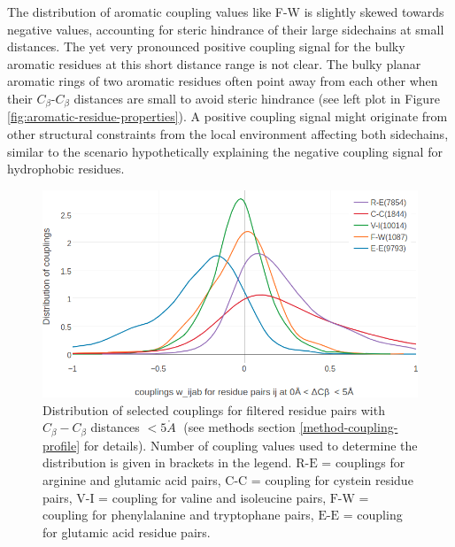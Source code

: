 \documentclass[11pt,a4paper,twoside]{book}
\newcommand{\Cb}{C_\beta}
\newcommand{\angstrom}{\mathring{A} \;}
\theoremstyle{definition}
\theoremstyle{definition}
\theoremstyle{remark}
\begin{document}
The distribution of aromatic coupling values like F-W is slightly skewed
towards negative values, accounting for steric hindrance of their large
sidechains at small distances. The yet very pronounced positive coupling
signal for the bulky aromatic residues at this short distance range is
not clear. The bulky planar aromatic rings of two aromatic residues
often point away from each other when their \(\Cb\)-\(\Cb\) distances
are small to avoid steric hindrance (see left plot in Figure
\ref{fig:aromatic-residue-properties}). A positive coupling signal might
originate from other structural constraints from the local environment
affecting both sidechains, similar to the scenario hypothetically
explaining the negative coupling signal for hydrophobic residues.











\begin{figure}

{\centering \includegraphics[width=1\linewidth]{img/coupling_matrix_analysis/1d_coupling_profile_0_5} 

}

\caption{Distribution of selected couplings
for filtered residue pairs with \(\Cb-\Cb\) distances \(< 5\angstrom\)
(see methods section \ref{method-coupling-profile} for details). Number
of coupling values used to determine the distribution is given in
brackets in the legend. \(\text{R-E}\) = couplings for arginine and
glutamic acid pairs, \(\text{C-C}\) = coupling for cystein residue
pairs, \(\text{V-I}\) = coupling for valine and isoleucine pairs,
\(\text{F-W}\) = coupling for phenylalanine and tryptophane pairs,
\(\text{E-E}\) = coupling for glutamic acid residue pairs.}\label{fig:1d-coupling-profile-0-5}
\end{figure}
\end{document}
